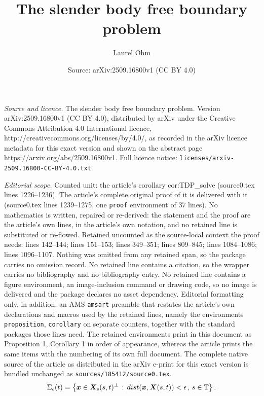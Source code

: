 \documentclass[10pt,a4paper]{amsart}
\title{The slender body free boundary problem}
\author{Laurel Ohm}
\date{Source: arXiv:2509.16800v1 (CC BY 4.0)}
\newcommand{\T}{\mathbb{T}}
\newcommand{\X}{\bm{X}}
\newcommand{\bx}{\bm{x}}
\begin{document}
\maketitle

\noindent\emph{Source and licence.} The slender body free boundary problem. Version arXiv:2509.16800v1 (CC BY 4.0), distributed by arXiv under the Creative Commons Attribution 4.0 International licence, http://creativecommons.org/licenses/by/4.0/, as recorded in the arXiv licence metadata for this exact version and shown on the abstract page https://arxiv.org/abs/2509.16800v1. Full licence notice: \texttt{licenses/arxiv-2509.16800-CC-BY-4.0.txt}.\par\smallskip

\noindent\textit{Editorial scope.} Counted unit: the article's corollary cor:TDP\_solve (source0.tex lines 1226--1236). The article's complete original proof of it is delivered with it (source0.tex lines 1239--1275, one \texttt{proof} environment of 37 lines). No mathematics is written, repaired or re-derived: the statement and the proof are the article's own lines, in the article's own notation, and no retained line is substituted or re-flowed.  Retained uncounted as the source-local context the proof needs: lines 142--144; lines 151--153; lines 349--351; lines 809--845; lines 1084--1086; lines 1096--1107.  Nothing was omitted from any retained span, so the package carries no omission record.  No retained line contains a citation, so the wrapper carries no bibliography and no bibliography entry.  No retained line contains a figure environment, an image-inclusion command or drawing code, so no image is delivered and the package declares no asset dependency.  Editorial formatting only, in addition: an AMS \texttt{amsart} preamble that restates the article's own declarations and macros used by the retained lines, namely the environments \texttt{proposition}, \texttt{corollary} on separate counters, together with the standard packages those lines need.  The retained environments print in this document as Proposition 1, Corollary 1 in order of appearance, whereas the article prints the same items with the numbering of its own full document.  The complete native source of the article as distributed in the arXiv e-print for this exact version is bundled unchanged as \texttt{sources/185412/source0.tex}.
\begin{equation}\label{eq:SigmaEps}
  \Sigma_\epsilon(t) = \big\{ \bx\in \X_s(s,t)^\perp\,:\, {\rm dist}(\bx,\X(s,t))<\epsilon\,, \, s\in \T \big\}\,.
\end{equation}
\end{document}
